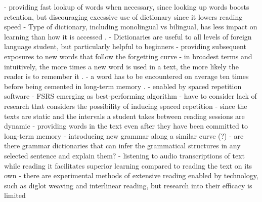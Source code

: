 \documentclass[
	letterpaper, %
]{jdf}
\begin{document}
    - providing fast lookup of words when necessary, since looking up words boosts retention, but discouraging excessive use of dictionary since it lowers reading speed \cite{dictionaryimportance}
    - Type of dictionary, including monolingual vs bilingual, has less impact on learning than how it is accessed \cite{dictionarypitfalls, imagesdictionary, bilingual_dictionary}.
    - Dictionaries are useful to all levels of foreign language student, but particularly helpful to beginners \cite{dictionaryvalue}
  - providing subsequent exposures to new words that follow the forgetting curve
    - in broadest terms and intuitively, the more times a new word is used in a text, the more likely the reader is to remember it \cite{clockworkorange}.
    - a word has to be encountered on average ten times before being cemented in long-term memory \cite{Nation2020GradedRA}.
    - enabled by spaced repetition software
      - FSRS emerging as best-performing algorithm \cite{shortestpathrepetitionscheduling}
    - have to consider lack of research that considers the possibility of inducing spaced repetition
      - since the texts are static and the intervals a student takes between reading sessions are dynamic
    - providing words in the text even after they have been committed to long-term memory \cite{cepedasrs}
  - introducing new grammar along a similar curve (?)
    - are there grammar dictionaries that can infer the grammatical structures in any selected sentence and explain them?
  - listening to audio transcriptions of text while reading it facilitates superior learning compared to reading the text on its own \cite{Chang2015ImprovingRR}
  - there are experimental methods of extensive reading enabled by technology, such as diglot weaving and interlinear reading, but research into their efficacy is limited \cite{hyplern_interlinear_reading, diglot_weave}
      
\end{document}

